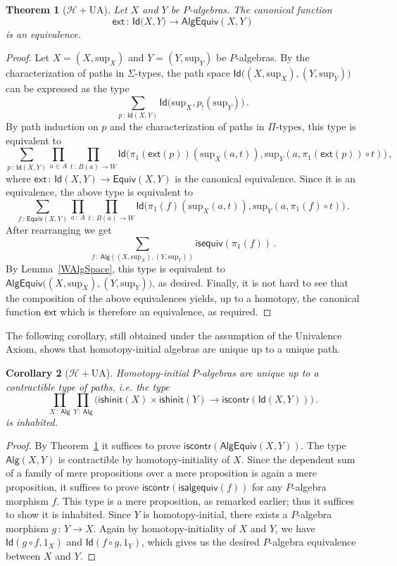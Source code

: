 \documentclass[10pt,a4paper,oneside,reqno]{amsart}
\theoremstyle{mythm}
\newtheorem{theorem}{Theorem}[section]
\newtheorem{corollary}[theorem]{Corollary}
\theoremstyle{mydef}
\theoremstyle{myrmk}
\newcommand{\co}{\,{:}\,}
\newcommand{\Hint}{\mathcal{H}}
\newcommand{\UA}{\mathrm{UA}}
\newcommand{\iscontr}{\mathsf{iscontr}}
\newcommand{\isequiv}{\mathsf{isequiv}}
\newcommand{\isalghinit}{\mathsf{ishinit}}
\newcommand{\ext}{\mathsf{ext}}
\newcommand{\Id}{\mathsf{Id}}
\newcommand{\Palg}{\mathsf{Alg}}
\renewcommand{\sup}{\mathrm{sup}}
\newcommand{\isalgequiv}{\mathsf{isalgequiv}}
\newcommand{\AlgEquiv}{\mathsf{AlgEquiv}}
\begin{document}
\begin{theorem}[$\Hint + \UA$] \label{thm:Punivalence}
Let $X$ and $Y$ be $P$-algebras. The canonical function
\[ 
\ext \co \Id \big(X,Y\big) \to  \AlgEquiv(X,Y) 
\]
is an equivalence.
\end{theorem}

\begin{proof} 
Let $X = (X,\sup_X)$ and $Y= (Y,\sup_Y)$ be $P$-algebras. By the characterization of paths in $\Sigma$-types, the path space 
$\Id \big( (X,\sup_X) ,  (Y,\sup_Y) \big)$ can be expressed as the type
\[
\sum_{p \co \Id(X, Y)} \Id \big( \sup_X ,  p_{!}(\sup_Y)  \big) \, .
\]
By path induction on $p$ and the characterization of paths in $\Pi$-types, this type is equivalent to
\[  
\sum_{p \co \Id(X,Y)}  
\prod_{a \in A} 
\prod_{t \co B(a) \to W} 
\Id \big(  \pi_1(\ext(p))( \sup_X(a,t)),  \sup_Y(a, \pi_1(\ext (p)) \circ t) \big) \, , 
\]
where $\ext \co \Id(X,Y) \to \mathsf{Equiv}(X,Y)$ is the canonical equivalence. Since it is an equivalence, the above type is equivalent to
\[
\sum_{f \co \mathsf{Equiv}(X,Y)} \prod_{a \co A} \prod_{t \co B(a) \to W} \Id \big( \pi_1(f) (\sup_X(a,t))  , \sup_Y (a, \pi_1(f) \circ t) \big) \, .
\]
After rearranging we get
\[
\sum_{f \co \Palg ( (X,\sup_X),  (Y,\sup_Y) )}  \isequiv(\pi_1(f)) \, .
\]
By Lemma~\ref{WAlgSpace}, this type is equivalent to $\AlgEquiv \big( (X,\sup_X),  (Y,\sup_Y)\big)$, as desired. Finally, it is not hard to see that the composition of the above equivalences yields, up to a homotopy, the canonical function $\ext$ which is therefore an equivalence, as required.
\end{proof} 

The following corollary, still obtained under the assumption of the Univalence Axiom, shows that
homotopy-initial algebras are unique up to a unique path.

\begin{corollary}[$\Hint + \UA$] \label{WHInitIso}
Homotopy-initial $P$-algebras are unique up to a  contractible type of paths, i.e. the type
\[ 
\prod_{X \co \Palg} \prod_{Y \co \Palg}  \Big( \isalghinit(X) \times \isalghinit(Y)  \to 
\iscontr(\Id(X,Y)) \Big) \, .
\] 
is inhabited.
\end{corollary}

\begin{proof}
By Theorem~\ref{thm:Punivalence} it suffices to prove $\iscontr(\AlgEquiv(X,Y))$. The type $\Palg(X,Y)$ is contractible by homotopy-initiality of $X$. Since the dependent sum of a family of mere propositions over a mere proposition is again a mere proposition, it suffices to prove $\iscontr(\isalgequiv(f))$ for any $P$-algebra morphism $f$. This type is a mere proposition, as remarked earlier; thus it suffices to show it is inhabited.
Since $Y$ is homotopy-initial, there exists a $P$-algebra morphism $g \co Y \to X$. Again by homotopy-initiality of $X$ and 
$Y$, we have $\Id(g \circ f, 1_X)$ and $\Id(f \circ g, 1_Y)$, which gives us the desired $P$-algebra equivalence between 
$X$ and $Y$.
\end{proof}
\end{document}
